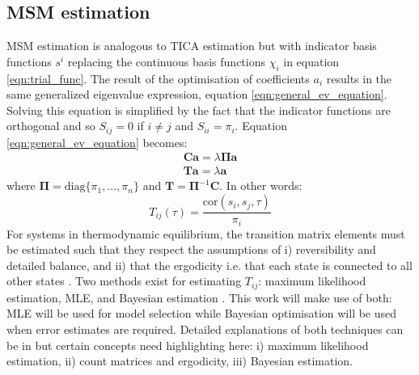 \subsection{MSM estimation}
MSM estimation is analogous to TICA estimation but with  indicator basis functions $s^{i}$ replacing the continuous basis functions $\chi_{i}$ in equation \ref{eqn:trial_func}. \cite{nuskeVariationalApproachMolecular2014} The result of the optimisation of coefficients $a_{i}$ results in the same generalized eigenvalue expression, equation \ref{eqn:general_ev_equation}. Solving this equation is simplified by the fact that the indicator functions are orthogonal and so $S_{ij} = 0$ if $i \neq j$ and $S_{ii} = \pi_{i}$. Equation \ref{eqn:general_ev_equation} becomes: \cite{nuskeVariationalApproachMolecular2014}\cite{prinzMarkovModelsMolecular2011} 
\begin{align}\label{eqn:tran_def}
 \mathbf{C a}=\lambda \bm{\Pi} \mathbf{a} \\
\mathbf{T a}=\lambda \mathbf{a}   
\end{align}
where $\bm{\Pi} = \mathrm{diag}\{\pi_{1}, \ldots, \pi_{n}\}$ and $\mathbf{T} = \bm{\Pi}^{-1}\mathbf{C}$. In other words: 
\begin{equation}\label{eqn:tran_mat_def}
    T_{ij}(\tau) =\frac{\mathrm{cor}(s_{i}, s_{j}, \tau)}{\pi_{i}}
\end{equation}
For systems in thermodynamic equilibrium, the transition matrix elements must be estimated such that they respect the assumptions of i) reversibility and detailed balance, and ii) that the ergodicity i.e. that each state is connected to all other states \cite{nuskeVariationalApproachMolecular2014}\cite{prinzMarkovModelsMolecular2011}. Two methods exist for estimating $T_{ij}$: maximum likelihood estimation, MLE, \cite{prinzMarkovModelsMolecular2011}\cite{bowmanProgressChallengesAutomated2009b} and Bayesian estimation \cite{trendelkamp-schroerEstimationUncertaintyReversible2015b}. This work will make use of both: MLE will be used for model selection while Bayesian optimisation will be used when error estimates are required.  Detailed explanations of both  techniques can be in \cite{trendelkamp-schroerEstimationUncertaintyReversible2015b} but certain concepts need highlighting here: i) maximum likelihood estimation, ii) count matrices and ergodicity, iii) Bayesian estimation. 


